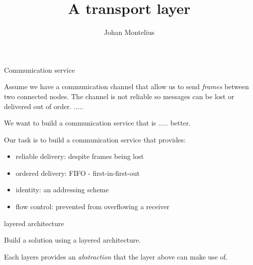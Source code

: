 

\title[ID1019 A transport layer]{A transport layer}


\author{Johan Montelius}
\date{\semester}



\begin{frame}
\titlepage
\end{frame}

\begin{frame}{Communication service}

  Assume we have a communication channel that allow us to send {\em
    frames} between two connected nodes. The channel is not reliable
  so messages can be lost or delivered out of order. \pause ..... 

\vspace{20pt}
\pause We want to build a communication service that is ..... \pause better.

\pause
\vspace{20pt}

Our task is to build a communication service that provides: \pause

\begin{itemize}

\item reliable delivery: despite frames being lost \pause

\item ordered delivery: FIFO - first-in-first-out \pause

\item identity: an addressing scheme \pause

\item flow control: prevented from overflowing a receiver  

\end{itemize}


\end{frame}

\begin{frame}{layered architecture}

Build a solution using a layered architecture. 

\vspace{20pt} \pause

Each layers provides an {\em abstraction} that the layer above can make use of.

\end{frame}

